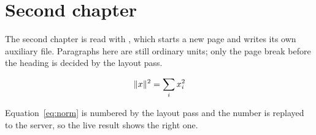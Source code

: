 \section{Second chapter}\label{sec:two}
The second chapter is read with \verb||, which starts a new page and writes its own auxiliary file. Paragraphs here are still ordinary units; only the page break before the heading is decided by the layout pass.

\begin{equation}
  \lVert x \rVert^2 = \sum_i x_i^2 \label{eq:norm}
\end{equation}

Equation~\eqref{eq:norm} is numbered by the layout pass and the number is replayed to the server, so the live result shows the right one.
